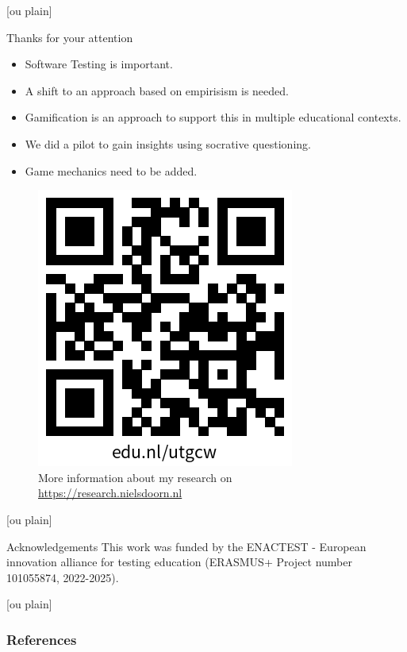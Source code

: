 \documentclass[aspectratio=169]{beamer}
\begin{document}
[ou plain]
\begin{frame}{Thanks for your attention}

\begin{itemize}
    \item Software Testing is important.
    \item A shift to an approach based on empirisism is needed.
    \item Gamification is an approach to support this in multiple educational contexts.
    \item We did a pilot to gain insights using socrative questioning.
    \item Game mechanics need to be added.
\end{itemize}


\begin{figure}
    \centering
    \includegraphics[width=0.25\linewidth]{images//qr.png}
    \caption{More information about my research on \url{https://research.nielsdoorn.nl}}
\end{figure}
\end{frame}

[ou plain]
\begin{frame}{Acknowledgements}
    This work was funded by the ENACTEST - European innovation alliance for testing education (ERASMUS+ Project number 101055874, 2022-2025).
\end{frame}

[ou plain]
\begin{frame}[allowframebreaks]
    \frametitle{References}
    \printbibliography
\end{frame}
\end{document}
